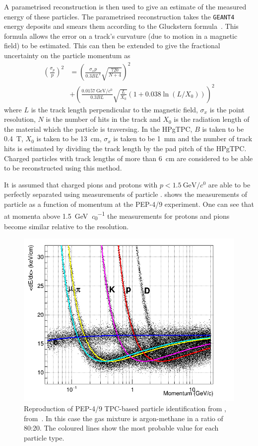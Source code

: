 A parametrised reconstruction is then used to give an estimate of the measured energy of these particles.
The parametrised reconstruction takes the \texttt{GEANT4} energy deposits and smears them according to the Gluckstern formula~\cite{gluckstern}.
This formula allows the error on a track's curvature (due to motion in a magnetic field) to be estimated.
This can then be extended to give the fractional uncertainty on the particle momentum as
\begin{align}
	\left(\frac{\sigma_{p}}{p}\right)^{2} &= \left( \frac{\sigma_{x} p}{0.3 B L^{2}} \sqrt{ \frac{720}{N+4} } \right)^{2} \nonumber \\
	&+ \left( \frac{\SI{0.0157}{\GeV\per\clight}}{0.3BL}\sqrt{\frac{L}{X_{0}}}\left( 1 + 0.038 \ln(L/X_{0}) \right) \right)^{2}
\end{align}
where $L$ is the track length perpendicular to the magnetic field, $\sigma_{x}$ is the point resolution, $N$ is the number of hits in the track and $X_0$ is the radiation length of the material which the particle is traversing.
In the HPgTPC, $B$ is taken to be \SI{0.4}{\tesla}, $X_{0}$ is taken to be \SI{13}{\cm}, $\sigma_{x}$ is taken to be \SI{1}{\mm} and the number of track hits is estimated by dividing the track length by the pad pitch of the HPgTPC.
Charged particles with track lengths of more than \SI{6}{\cm} are considered to be able to be reconstructed using this method.

It is assumed that charged pions and protons with $p < \SI{1.5}{\GeV\per\clight}$ are able to be perfectly separated using measurements of particle \dedx.
 shows the measurements of particle \dedx as a function of momentum at the PEP-4/9 experiment. 
One can see that at momenta above \SI{1.5}{\GeV\per\clight} the \dedx measurements for protons and pions become similar relative to the \dedx resolution.

\begin{figure}[h]
	\centering
	\includegraphics[width=.6\linewidth]{files/figures/dune_ndrwt/pep4_dedx_reproduction}
	\caption[PEP-4/9 TPC-based particle identification from \dedx]{Reproduction of PEP-4/9 TPC-based particle identification from \dedx, from~\cite{pep4}. In this case the gas mixture is argon-methane in a ratio of 80:20. The coloured lines show the most probable value for each particle type.}
	\label{fig:pep4dedx}
\end{figure}

